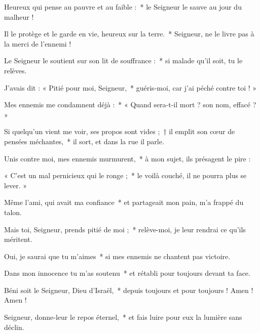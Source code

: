 \item Heureux qui pense au pauvre et au faible :~* le Seigneur le sauve au jour du malheur !

\item Il le protège et le garde en vie, heureux sur la terre.~* Seigneur, ne le livre pas à la merci de l'ennemi !

\item Le Seigneur le soutient sur son lit de souffrance :~* si malade qu'il soit, tu le relèves.

\item J'avais dit : « Pitié pour moi, Seigneur,~* guéris-moi, car j'ai péché contre toi ! »

\item Mes ennemis me condamnent déjà :~* « Quand sera-t-il mort ? son nom, effacé ? »

\item Si quelqu'un vient me voir, ses propos sont vides ;~† il emplit son cœur de pensées méchantes,~* il sort, et dans la rue il parle.

\item Unis contre moi, mes ennemis murmurent,~* à mon sujet, ils présagent le pire :

\item « C'est un mal pernicieux qui le ronge ;~* le voilà couché, il ne pourra plus se lever. »

\item Même l'ami, qui avait ma confiance~* et partageait mon pain, m'a frappé du talon.

\item Mais toi, Seigneur, prends pitié de moi ;~* relève-moi, je leur rendrai ce qu'ils méritent.

\item Oui, je saurai que tu m'aimes~* si mes ennemis ne chantent pas victoire.

\item Dans mon innocence tu m'as soutenu~* et rétabli pour toujours devant ta face.

\item Béni soit le Seigneur, Dieu d'Israël,~* depuis toujours et pour toujours ! Amen ! Amen !

\item Seigneur, donne-leur le repos éternel,~* et fais luire pour eux la lumière sans déclin.